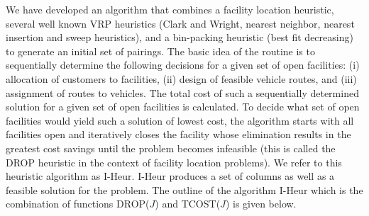 We have developed an algorithm that combines a facility location heuristic, 
several well known VRP heuristics (Clark and Wright, nearest neighbor, 
nearest insertion and sweep heuristics), and a bin-packing heuristic (best fit 
decreasing) to generate an initial set of pairings. The basic idea of the routine 
is to sequentially determine the following decisions for a given set of open 
facilities: (i) allocation of customers to facilities, (ii) design of feasible 
vehicle routes, and (iii) assignment of routes to vehicles. The total cost of such 
a sequentially determined solution for a given set of open facilities is calculated. 
To decide what set of open facilities would yield such a solution of lowest cost, 
the algorithm starts with all facilities open and iteratively closes the facility 
whose elimination results in the greatest cost savings until the problem becomes 
infeasible (this is called the DROP heuristic in the context of facility location problems).
We refer to this heuristic algorithm as I-Heur. I-Heur produces a set of columns
as well as a feasible solution for the problem. The outline of the algorithm
I-Heur which is the combination of functions DROP($J$) and TCOST($J$) is given below.

